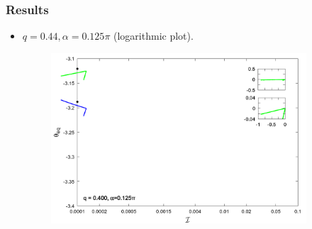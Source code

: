\documentclass{beamer}
\begin{document}
\begin{frame}
	\frametitle{Results}
	\begin{overlayarea}{\textwidth}{\textheight}
\begin{itemize}
	\item $q=0.44, \alpha=0.125\pi$ (logarithmic plot).
	\begin{figure}[htb]
		\begin{center}
			\includegraphics[width=0.9\textwidth]{plots/initial_combine_elastic_beam_I_theta_q_0.400_alpha_0.125pi_initial_-4.80_0.png}
		\end{center}
	\end{figure}
\end{itemize}
	\end{overlayarea}
\end{frame}

\end{document}
